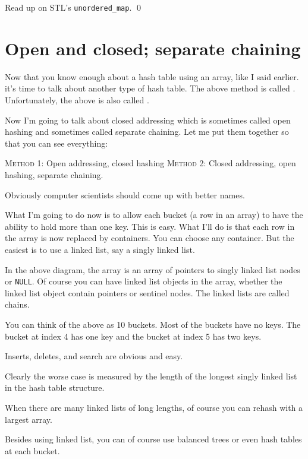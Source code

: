 \begin{ex}
Read up on STL's \verb!unordered_map!.
\qed
\end{ex}




\newpage
\section{Open and closed; separate chaining}

Now that you know enough about a hash table using an array,
like I said earlier. it's time to talk about another type of hash table.
The above method is called .
Unfortunately, the above is also called .

Now I'm going to talk about closed addressing which is sometimes called
open hashing and sometimes called separate chaining.
Let me put them together so that you can see everything:
\begin{tightlist}
\li \textsc{Method 1}: Open addressing, closed hashing
\li \textsc{Method 2}: Closed addressing, open hashing, separate chaining.
\end{tightlist}
Obviously computer scientists should come up with better
names.

What I'm going to do now is to allow each bucket
(a row in an array) to have the ability to hold more than one key.
This is easy.
What I'll do is that each row in the array is now replaced by 
containers.
You can choose any container.
But the easiest is to use a linked list, say a singly linked list.


In the above diagram, the array is an array of pointers to singly linked list nodes
or \verb!NULL!.
Of course you can have linked list objects in the array, 
whether the linked list object contain pointers or sentinel nodes.
The linked lists are called chains.

You can think of the above as 10 buckets.
Most of the buckets have no keys.
The bucket at index 4 has one key
and the bucket at index 5 has two keys.

Inserts, deletes, and search are obvious and easy.

Clearly the worse case is measured by the length of the longest singly
linked list in the hash table structure.

When there are many linked lists of long lengths,
of course you can rehash with a largest array.

Besides using linked list, you can of course use balanced trees or even
hash tables at each bucket.



